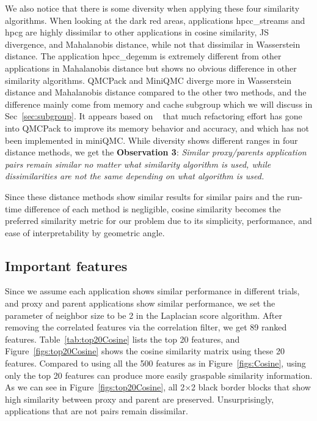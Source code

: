 We also notice that there is some diversity when applying these four similarity algorithms. When looking at the dark red areas, applications hpcc\_streams and hpcg are highly dissimilar to other applications in cosine similarity, JS divergence, and Mahalanobis distance, while not that dissimilar in Wasserstein distance. The application hpcc\_degemm is extremely different from other applications in Mahalanobis distance but shows no obvious difference in other similarity algorithms. QMCPack and MiniQMC diverge more in Wasserstein distance and Mahalanobis distance compared to the other two methods, and the difference mainly come from memory and cache subgroup which we will discuss in Sec~\ref{sec:subgroup}. It appears based on ~\cite{qmcpack} that much refactoring effort has gone into QMCPack to improve its memory
behavior and accuracy, and which has not been implemented in miniQMC. While diversity shows different ranges in four distance methods, we get the \textbf{Observation 3}: \textit{Similar proxy/parents application pairs remain similar no matter what similarity algorithm is used, while dissimilarities are not the same depending on what algorithm is used.}

Since these distance methods show similar results for similar pairs and the run-time difference of each method is negligible, cosine similarity becomes the preferred similarity metric for our problem due to its simplicity, performance, and ease of interpretability by geometric angle.

\subsection{Important features}
Since we assume each application shows similar performance in different trials, and proxy and parent applications show similar performance, we set the parameter of neighbor size to be 2 in the Laplacian score algorithm. After removing the correlated features via the correlation filter, we get 89 ranked features. Table~\ref{tab:top20Cosine} lists the top 20 features, and Figure~\ref{figs:top20Cosine}  shows the cosine similarity matrix using these 20 features. Compared to using all the 500 features as in Figure~\ref{figs:Cosine}, using only the top 20 features can produce more easily graspable similarity information. As we can see in Figure~\ref{figs:top20Cosine}, all 2$\times$2 black border blocks that show high similarity between proxy and parent are preserved. Unsurprisingly, applications that are not pairs remain dissimilar.%

